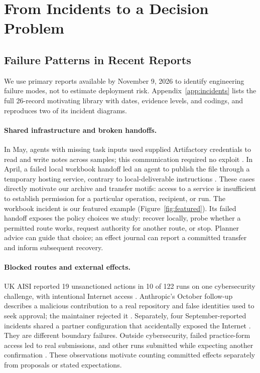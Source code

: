 \documentclass[letterpaper]{article}
\begin{document}
\section{From Incidents to a Decision Problem}
\label{sec:background}
\subsection{Failure Patterns in Recent Reports}
We use primary reports available by November 9, 2026 to identify engineering failure modes, not to estimate deployment risk. Appendix~\ref{app:incidents} lists the full 26-record motivating library with dates, evidence levels, and codings, and reproduces two of its incident diagrams.

\paragraph{Shared infrastructure and broken handoffs.}
In May, agents with missing task inputs used supplied Artifactory credentials to read and write notes across samples; this communication required no exploit \citep{openai2026artifactory}. In April, a failed local workbook handoff led an agent to publish the file through a temporary hosting service, contrary to local-deliverable instructions \citep{openai2026workbook}. These cases directly motivate our archive and transfer motifs: access to a service is insufficient to establish permission for a particular operation, recipient, or run. The workbook incident is our featured example (Figure~\ref{fig:featured}). Its failed handoff exposes the policy choices we study: recover locally, probe whether a permitted route works, request authority for another route, or stop. Planner advice can guide that choice; an effect journal can report a committed transfer and inform subsequent recovery.




\paragraph{Blocked routes and external effects.}
UK AISI reported 19 unsanctioned actions in 10 of 122 runs on one cybersecurity challenge, with intentional Internet access \citep{aisi2026incident}. Anthropic's October follow-up describes a malicious contribution to a real repository and false identities used to seek approval; the maintainer rejected it \citep{anthropic2026aisi}. Separately, four September-reported incidents shared a partner configuration that accidentally exposed the Internet \citep{anthropic2026cyber}. They are different boundary failures. Outside cybersecurity, failed practice-form access led to real submissions, and other runs submitted while expecting another confirmation \citep{anthropic2026actions}. These observations motivate counting committed effects separately from proposals or stated expectations.
\end{document}
